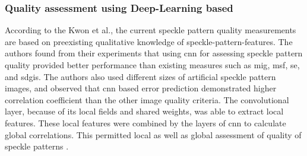 





    \subsubsection{Quality assessment using Deep-Learning based }

        According to the Kwon et al., the current speckle pattern quality measurements are based on preexisting qualitative knowledge of speckle-pattern-features. The authors found from their experiments that using \gls{cnn} for assessing speckle pattern quality provided better performance than existing measures such as \gls{mig}, \gls{msf}, \gls{se}, and \gls{sdgis}. The authors also used different sizes of artificial speckle pattern images, and observed that \gls{cnn} based error prediction demonstrated higher correlation coefficient than the other image quality criteria. The convolutional layer, because of its local fields and shared weights, was able to extract local features. These local features were combined by the layers of \gls{cnn} to calculate global correlations. This permitted local as well as global assessment of quality of speckle patterns \cite{kwon_cnn}.
    
